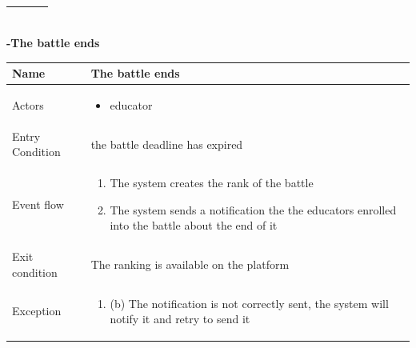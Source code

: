 \begin{enumerate}[label=\textbf{[UC\arabic*]}]
\begin{tabular}{|l|p{11cm}|}
\begin{enumerate} [label={}, leftmargin=0.25cm ]
        \end{enumerate}\\ 
        \hline            
    \end{tabular}
\newpage
    \item  \textbf{-The battle ends}
    \\ \begin{tabular}{|l|p{11cm}|}
        \hline
        Name & The battle ends \\
        \hline
        Actors & \begin{itemize}
                    \item educator
                \end{itemize} \\
        \hline
        Entry Condition & the battle deadline has expired \\
        \hline
        Event flow & \begin{enumerate}
            \item The system creates the rank of the battle
            \item The system sends a notification the the educators enrolled into the battle about the end of it
        \end{enumerate}\\
        \hline
        Exit condition & The ranking is available on the platform \\
        \hline
        Exception & \begin{enumerate} [label={}, leftmargin=0.25cm ]
            \item (b) The notification is not correctly sent, the system will notify it and retry to send it
        \end{enumerate}\\ 
        \hline            
    \end{tabular}


\end{enumerate}
